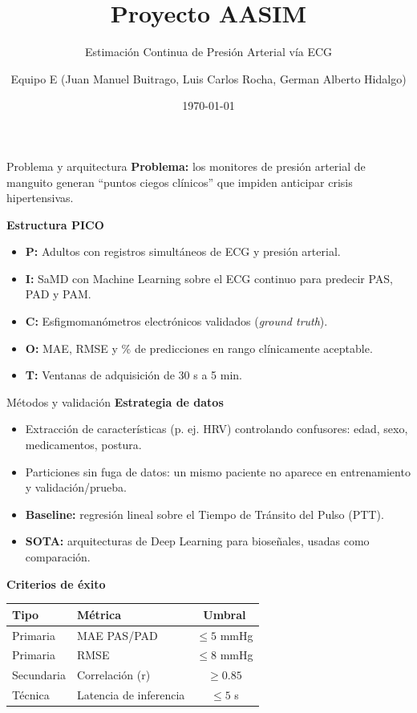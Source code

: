 \documentclass[aspectratio=169]{beamer}
\title{Proyecto AASIM}
\subtitle{Estimación Continua de Presión Arterial vía ECG}
\author{Equipo E (Juan Manuel Buitrago, Luis Carlos Rocha, German Alberto Hidalgo)}
\date{\today}
\begin{document}
\begin{frame}
  \titlepage
\end{frame}

\begin{frame}{Problema y arquitectura}
  \textbf{Problema:} los monitores de presión arterial de manguito generan
  ``puntos ciegos clínicos'' que impiden anticipar crisis hipertensivas.

  \vspace{0.5em}
  \textbf{Estructura PICO}
  \begin{itemize}
    \item \textbf{P:} Adultos con registros simultáneos de ECG y presión arterial.
    \item \textbf{I:} SaMD con Machine Learning sobre el ECG continuo para predecir PAS, PAD y PAM.
    \item \textbf{C:} Esfigmomanómetros electrónicos validados (\textit{ground truth}).
    \item \textbf{O:} MAE, RMSE y \% de predicciones en rango clínicamente aceptable.
    \item \textbf{T:} Ventanas de adquisición de 30 s a 5 min.
  \end{itemize}
\end{frame}

\begin{frame}{Métodos y validación}
  \textbf{Estrategia de datos}
  \begin{itemize}
    \item Extracción de características (p. ej. HRV) controlando confusores: edad, sexo, medicamentos, postura.
    \item Particiones sin fuga de datos: un mismo paciente no aparece en entrenamiento y validación/prueba.
    \item \textbf{Baseline:} regresión lineal sobre el Tiempo de Tránsito del Pulso (PTT).
    \item \textbf{SOTA:} arquitecturas de Deep Learning para bioseñales, usadas como comparación.
  \end{itemize}

  \vspace{0.5em}
  \textbf{Criterios de éxito}
  \begin{table}
    \centering
    \begin{tabular}{llc}
      \toprule
      Tipo & Métrica & Umbral \\
      \midrule
      Primaria & MAE PAS/PAD & $\le 5$ \si{\mmHg} \\
      Primaria & RMSE & $\le 8$ \si{\mmHg} \\
      Secundaria & Correlación (r) & $\ge 0.85$ \\
      Técnica & Latencia de inferencia & $\le 5$ s \\
      \bottomrule
    \end{tabular}
  \end{table}
\end{frame}
\end{document}
